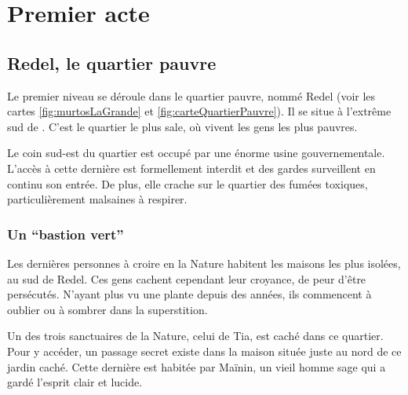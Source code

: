
\printMiniToc




\section{Premier acte}
\label{sec:premierActe}

\subsection{Redel, le quartier pauvre}
Le premier niveau se déroule dans le quartier pauvre, nommé Redel (voir les cartes \ref{fig:murtosLaGrande} et \ref{fig:carteQuartierPauvre}). Il se situe à l'extrême sud de \nomVille. C'est le quartier le plus sale, où vivent les gens les plus pauvres.

Le coin sud-est du quartier est occupé par une énorme usine gouvernementale. L'accès à cette dernière est formellement interdit et des gardes surveillent en continu son entrée. De plus, elle crache sur le quartier des fumées toxiques, particulièrement malsaines à respirer.

\subsubsection{Un \enquote{bastion vert}}
Les dernières personnes à croire en la Nature habitent les maisons les plus isolées, au sud de Redel. Ces gens cachent cependant leur croyance, de peur d'être persécutés. N'ayant plus vu une plante depuis des années, ils commencent à oublier ou à sombrer dans la superstition.

Un des trois sanctuaires de la Nature, celui de Tia, est caché dans ce quartier. Pour y accéder, un passage secret existe dans la maison située juste au nord de ce jardin caché. Cette dernière est habitée par Maïnin, un vieil homme sage qui a gardé l'esprit clair et lucide.


